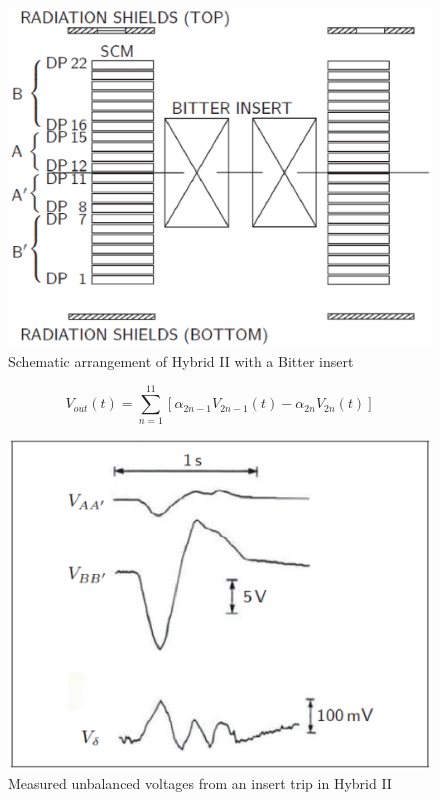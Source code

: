 \begin{figure}
	\centering
	\includegraphics[scale=0.6]{chpt8/figs/fig8.20.eps}
	\caption{Schematic arrangement of Hybrid II with a Bitter insert}
\end{figure}




\begin{equation}%
V_{out}(t)=\sum_{n=1}^{11}[\alpha_{2n-1}V_{2n-1}(t)-\alpha_{2n}V_{2n}(t)]
\end{equation}

\begin{figure}
	\centering
	\includegraphics[scale=0.6]{chpt8/figs/fig8.21.eps}
	\caption{Measured unbalanced voltages from an insert trip in Hybrid II}
\end{figure}




